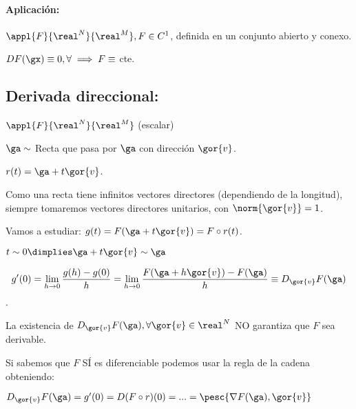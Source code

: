 \documentclass{apuntes}
\begin{document}
\paragraph{Aplicación:\\}

$\appl{F}{\real^N}{\real^M}, F \in C^1$, definida en un conjunto abierto y conexo.

$DF(\gx) \equiv 0, \forall \implies F \equiv $ cte.	

\subsection{Derivada direccional: }

$\appl{F}{\real^N}{\real^M}$ (escalar)

$\ga \sim$ Recta que pasa por $\ga$ con dirección $\gor{v}$.

$r(t) = \ga + t\gor{v}$. 

\obs
Como una recta tiene infinitos vectores directores (dependiendo de la longitud), siempre tomaremos vectores directores unitarios, con $\norm{\gor{v}} = 1$.


Vamos a estudiar: $g(t) = F(\ga + t\gor{v}) = F \circ r (t)$.

$t \sim 0 \dimplies \ga + t\gor{v} \sim \ga$
\begin{defn} 
$$g'(0) = \displaystyle\lim_{h \rightarrow 0} \frac{g(h)-g(0)}{h} = \displaystyle\lim_{h \rightarrow 0} \frac{F(\ga+h\gor{v})-F(\ga)}{h} \equiv D_{\gor{v}}F(\ga)$$. 
\end{defn}

\obs
La existencia de $D_{\gor{v}}F(\ga), \forall \gor{v}\in \real^N$ NO garantiza que $F$ sea derivable.


Si sabemos que $F$ SÍ es diferenciable podemos usar la regla de la cadena obteniendo:

$D_{\gor{v}}F(\ga) = g'(0) = D(F\circ r)(0) = ... = \pesc{\nabla F(\ga),\gor{v}}$
\end{document}
